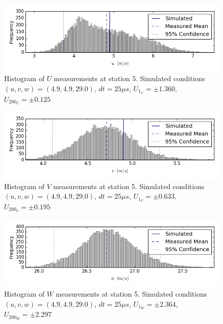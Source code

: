 \begin{figure}[H]
\centering
\includegraphics[width=6in]{figs/Ely_May28th05001/uncertainty_Ely_May28th05001_U}
\caption{Histogram of $U$ measurements at station 5. Simulated conditions $(u,v,w)=(4.9, 4.9, 29.0)$, $dt=25 \mu s$, $U_1_U=\pm 1.360$, $U_200_U=\pm 0.125$}
\label{fig:uncertainty_Ely_May28th05001_U}
\end{figure}


\begin{figure}[H]
\centering
\includegraphics[width=6in]{figs/Ely_May28th05001/uncertainty_Ely_May28th05001_V}
\caption{Histogram of $V$ measurements at station 5. Simulated conditions $(u,v,w)=(4.9, 4.9, 29.0)$, $dt=25 \mu s$, $U_1_V=\pm 0.633$, $U_200_V=\pm 0.195$}
\label{fig:uncertainty_Ely_May28th05001_V}
\end{figure}


\begin{figure}[H]
\centering
\includegraphics[width=6in]{figs/Ely_May28th05001/uncertainty_Ely_May28th05001_W}
\caption{Histogram of $W$ measurements at station 5. Simulated conditions $(u,v,w)=(4.9, 4.9, 29.0)$, $dt=25 \mu s$, $U_1_W=\pm 2.364$, $U_200_W=\pm 2.297$}
\label{fig:uncertainty_Ely_May28th05001_W}
\end{figure}


